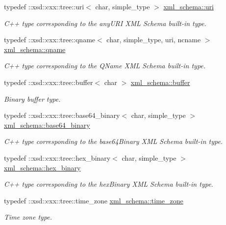 \begin{DoxyCompactItemize}
typedef \+::xsd\+::cxx\+::tree\+::uri$<$ char, simple\+\_\+type $>$ \hyperlink{namespacexml__schema_a2518fddf119bd258d7443408863ee457}{xml\+\_\+schema\+::uri}
\begin{DoxyCompactList}\small\item\em C++ type corresponding to the any\+U\+R\+I X\+M\+L Schema built-\/in type. \end{DoxyCompactList}\item 
typedef \+::xsd\+::cxx\+::tree\+::qname$<$ char, simple\+\_\+type, uri, ncname $>$ \hyperlink{namespacexml__schema_af47d5d85d1b1714be503513b1c09c079}{xml\+\_\+schema\+::qname}
\begin{DoxyCompactList}\small\item\em C++ type corresponding to the Q\+Name X\+M\+L Schema built-\/in type. \end{DoxyCompactList}\item 
typedef \+::xsd\+::cxx\+::tree\+::buffer$<$ char $>$ \hyperlink{namespacexml__schema_aff62181c1704f35372302e2acde9b0cc}{xml\+\_\+schema\+::buffer}
\begin{DoxyCompactList}\small\item\em Binary buffer type. \end{DoxyCompactList}\item 
typedef \+::xsd\+::cxx\+::tree\+::base64\+\_\+binary$<$ char, simple\+\_\+type $>$ \hyperlink{namespacexml__schema_a4d35d3537187e95237936654b31ba164}{xml\+\_\+schema\+::base64\+\_\+binary}
\begin{DoxyCompactList}\small\item\em C++ type corresponding to the base64\+Binary X\+M\+L Schema built-\/in type. \end{DoxyCompactList}\item 
typedef \+::xsd\+::cxx\+::tree\+::hex\+\_\+binary$<$ char, simple\+\_\+type $>$ \hyperlink{namespacexml__schema_a8179ecdc89c60ae524aa6b63ee9d7f77}{xml\+\_\+schema\+::hex\+\_\+binary}
\begin{DoxyCompactList}\small\item\em C++ type corresponding to the hex\+Binary X\+M\+L Schema built-\/in type. \end{DoxyCompactList}\item 
typedef \+::xsd\+::cxx\+::tree\+::time\+\_\+zone \hyperlink{namespacexml__schema_a8e57a44a0fd5762cb4132689a635d6c3}{xml\+\_\+schema\+::time\+\_\+zone}
\begin{DoxyCompactList}\small\item\em Time zone type. \end{DoxyCompactList}\item 

\end{DoxyCompactItemize}
